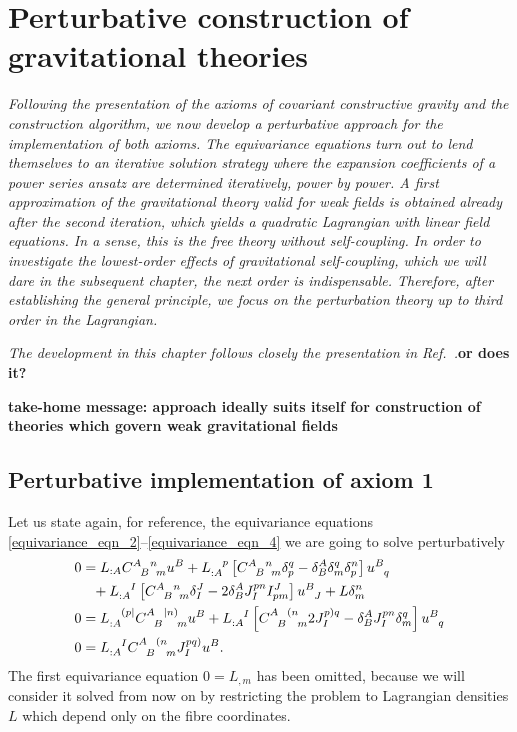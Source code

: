 \chapter{Perturbative construction of gravitational theories}
\label{chapter_perturbation}

\textit{Following the presentation of the axioms of covariant constructive gravity and the construction algorithm, we now develop a perturbative approach for the implementation of both axioms. The equivariance equations turn out to lend themselves to an iterative solution strategy where the expansion coefficients of a power series ansatz are determined iteratively, power by power. A first approximation of the gravitational theory valid for weak fields is obtained already after the second iteration, which yields a quadratic Lagrangian with linear field equations. In a sense, this is the free theory without self-coupling. In order to investigate the lowest-order effects of gravitational self-coupling, which we will dare in the subsequent chapter, the next order is indispensable. Therefore, after establishing the general principle, we focus on the perturbation theory up to third order in the Lagrangian.}

\textit{The development in this chapter follows closely the presentation in Ref.~\cite{Alex_2020}.}\textbf{or does it?}

\textbf{take-home message: approach ideally suits itself for construction of theories which govern weak gravitational fields}

\section{Perturbative implementation of axiom 1}

Let us state again, for reference, the equivariance equations \eqref{equivariance_eqn_2}--\eqref{equivariance_eqn_4} we are going to solve perturbatively
\begin{equation*}
    \begin{aligned}
      0 &{} = L_{:A} \gmc{A}{B}{n}{m}u^B + L_{:A}^{\hphantom{:A}p}\left\lbrack\gmc{A}{B}{n}{m} \delta^q_p - \delta^A_B\delta^q_m\delta^n_p\right\rbrack u^{B}_{\hphantom Bq} \nonumber \\
        &{} \hphantom{=} + L_{:A}^{\hphantom{:A}I} \left\lbrack\gmc{A}{B}{n}{m} \delta^J_I - 2 \delta^A_B J^{pn}_{I} I^J_{pm}\right\rbrack u^B_{\hphantom BJ} + L\delta^n_m \\
      0 &{} = L_{:A}^{\hphantom{:A}(p\mid} \gmc{A}{B}{\mid n)}{m} u^B + L_{:A}^{\hphantom{:A}I}\left\lbrack\gmc{A}{B}{(n}{m} 2J^{p)q}_I - \delta^A_B J^{pn}_I \delta^q_m\right\rbrack u^B_{\hphantom Bq} \\
      0 &{} = L_{:A}^{\hphantom{:A}I} \gmc{A}{B}{(n}{m} J^{pq)}_I u^B.
    \end{aligned}
\end{equation*}
The first equivariance equation $0 = L_{,m}$ has been omitted, because we will consider it solved from now on by restricting the problem to Lagrangian densities $L$ which depend only on the fibre coordinates.

